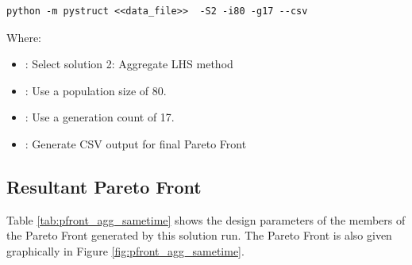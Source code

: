 \begin{verbatim}
python -m pystruct <<data_file>>  -S2 -i80 -g17 --csv
\end{verbatim}

\noindent Where: 

\begin{itemize}
  \item {}: Select solution 2: Aggregate LHS method
  \item {}: Use a population size of 80. 
  \item {}: Use a generation count of 17. 
  \item {}: Generate CSV output for final Pareto Front
\end{itemize}

\subsection{Resultant Pareto Front}
Table \ref{tab:pfront_agg_sametime} shows the design parameters of the members of the Pareto Front generated by this solution run. The Pareto Front is also given graphically in Figure \ref{fig:pfront_agg_sametime}. 
